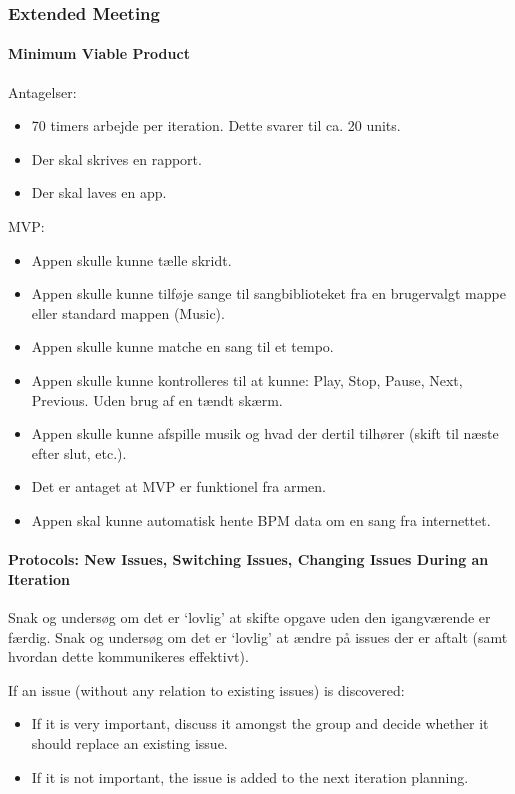 \subsubsection{Extended Meeting}

\paragraph{Minimum Viable Product}
Antagelser:
\begin{itemize}
\item 70 timers arbejde per iteration. Dette svarer til ca. 20 units.
\item Der skal skrives en rapport.
\item Der skal laves en app.
\end{itemize}
MVP:
\begin{itemize}
\item Appen skulle kunne tælle skridt.
\item Appen skulle kunne tilføje sange til sangbiblioteket fra en brugervalgt mappe eller standard mappen (Music).
\item Appen skulle kunne matche en sang til et tempo.
\item Appen skulle kunne kontrolleres til at kunne: Play, Stop, Pause, Next, Previous. Uden brug af en tændt skærm.
\item Appen skulle kunne afspille musik og hvad der dertil tilhører (skift til næste efter slut, etc.).
\item Det er antaget at MVP er funktionel fra armen.
\item Appen skal kunne automatisk hente BPM data om en sang fra internettet.
\end{itemize}

\paragraph{Protocols: New Issues, Switching Issues, Changing Issues During an Iteration}
Snak og undersøg om det er ‘lovlig' at skifte opgave uden den igangværende er færdig.
Snak og undersøg om det er ‘lovlig'  at ændre på issues der er aftalt (samt hvordan dette kommunikeres effektivt).

If an issue (without any relation to existing issues) is discovered:
\begin{itemize}
\item If it is very important, discuss it amongst the group and decide whether it should replace an existing issue.
\item If it is not important, the issue is added to the next iteration planning.
\end{itemize}

